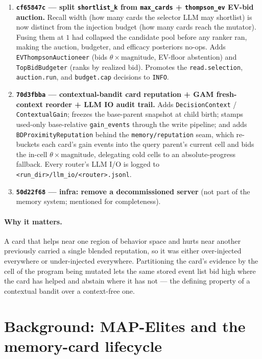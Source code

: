 \documentclass[11pt]{article}
\newcommand{\code}[1]{\texttt{#1}}
\begin{document}
\begin{enumerate}[leftmargin=2em,itemsep=2pt]
\item \textbf{\code{cf65847c} --- split \code{shortlist\_k} from \code{max\_cards}
+ \code{thompson\_ev} EV-bid auction.} Recall width (how many cards the selector
LLM may shortlist) is now distinct from the injection budget (how many cards
reach the mutator). Fusing them at $1$ had collapsed the candidate pool before
any ranker ran, making the auction, budgeter, and efficacy posteriors no-ops.
Adds \code{EVThompsonAuctioneer} (bids $\theta\!\times\!\text{magnitude}$, EV-floor
abstention) and \code{TopBidBudgeter} (ranks by realized bid). Promotes the
\code{read.selection}, \code{auction.run}, and \code{budget.cap} decisions to
\code{INFO}.
\item \textbf{\code{70d3fbba} --- contextual-bandit card reputation + GAM
fresh-context reorder + LLM IO audit trail.} Adds \code{DecisionContext} /
\code{ContextualGain}; freezes the base-parent snapshot at child birth;
stamps used-only base-relative \code{gain\_events} through the write pipeline;
and adds \code{BDProximityReputation} behind the \code{memory/reputation} seam,
which re-buckets each card's gain events into the query parent's current cell and
bids the in-cell $\theta\!\times\!\text{magnitude}$, delegating cold cells to an
absolute-progress fallback. Every router's LLM I/O is logged to
\code{<run\_dir>/llm\_io/<router>.jsonl}.
\item \textbf{\code{50d22f68} --- infra: remove a decommissioned server} (not
part of the memory system; mentioned for completeness).
\end{enumerate}

\paragraph{Why it matters.} A card that helps near one region of behavior space
and hurts near another previously carried a single blended reputation, so it was
either over-injected everywhere or under-injected everywhere. Partitioning the
card's evidence by the cell of the program being mutated lets the same stored
event list bid high where the card has helped and abstain where it has not ---
the defining property of a contextual bandit over a context-free one.

\section{Background: MAP-Elites and the memory-card lifecycle}
\end{document}

